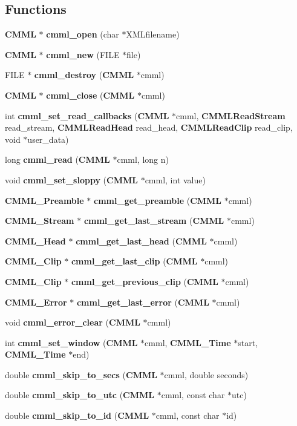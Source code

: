 \subsection*{Functions}
\begin{CompactItemize}
\item 
{\bf CMML} $\ast$ {\bf cmml\_\-open} (char $\ast$XMLfilename)
\item 
{\bf CMML} $\ast$ {\bf cmml\_\-new} (FILE $\ast$file)
\item 
FILE $\ast$ {\bf cmml\_\-destroy} ({\bf CMML} $\ast$cmml)
\item 
{\bf CMML} $\ast$ {\bf cmml\_\-close} ({\bf CMML} $\ast$cmml)
\item 
int {\bf cmml\_\-set\_\-read\_\-callbacks} ({\bf CMML} $\ast$cmml, {\bf CMMLRead\-Stream} read\_\-stream, {\bf CMMLRead\-Head} read\_\-head, {\bf CMMLRead\-Clip} read\_\-clip, void $\ast$user\_\-data)
\item 
long {\bf cmml\_\-read} ({\bf CMML} $\ast$cmml, long n)
\item 
void {\bf cmml\_\-set\_\-sloppy} ({\bf CMML} $\ast$cmml, int value)
\item 
{\bf CMML\_\-Preamble} $\ast$ {\bf cmml\_\-get\_\-preamble} ({\bf CMML} $\ast$cmml)
\item 
{\bf CMML\_\-Stream} $\ast$ {\bf cmml\_\-get\_\-last\_\-stream} ({\bf CMML} $\ast$cmml)
\item 
{\bf CMML\_\-Head} $\ast$ {\bf cmml\_\-get\_\-last\_\-head} ({\bf CMML} $\ast$cmml)
\item 
{\bf CMML\_\-Clip} $\ast$ {\bf cmml\_\-get\_\-last\_\-clip} ({\bf CMML} $\ast$cmml)
\item 
{\bf CMML\_\-Clip} $\ast$ {\bf cmml\_\-get\_\-previous\_\-clip} ({\bf CMML} $\ast$cmml)
\item 
{\bf CMML\_\-Error} $\ast$ {\bf cmml\_\-get\_\-last\_\-error} ({\bf CMML} $\ast$cmml)
\item 
void {\bf cmml\_\-error\_\-clear} ({\bf CMML} $\ast$cmml)
\item 
int {\bf cmml\_\-set\_\-window} ({\bf CMML} $\ast$cmml, {\bf CMML\_\-Time} $\ast$start, {\bf CMML\_\-Time} $\ast$end)
\item 
double {\bf cmml\_\-skip\_\-to\_\-secs} ({\bf CMML} $\ast$cmml, double seconds)
\item 
double {\bf cmml\_\-skip\_\-to\_\-utc} ({\bf CMML} $\ast$cmml, const char $\ast$utc)
\item 
double {\bf cmml\_\-skip\_\-to\_\-id} ({\bf CMML} $\ast$cmml, const char $\ast$id)
\item 

\end{CompactItemize}
